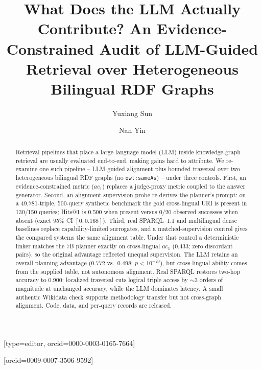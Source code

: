 \documentclass[a4paper,fleqn]{cas-dc}
\newcommand{\ac}[0]{\ensuremath{ac_1}}
\begin{document}
\let\WriteBookmarks\relax
\def\floatpagepagefraction{1}
\def\textpagefraction{.001}


\title[mode = title]{What Does the LLM Actually Contribute? An Evidence-Constrained
Audit of LLM-Guided Retrieval over Heterogeneous Bilingual RDF Graphs}

\author[1]{Yuxiang Sun}[type=editor,
  orcid=0000-0003-0165-7664]

\author[2]{Nan Yin}[orcid=0009-0007-3506-9592]


\begin{abstract}
Retrieval pipelines that place a large language model (LLM) inside
knowledge-graph retrieval are usually evaluated end-to-end, making gains hard
to attribute. We re-examine one such pipeline -- LLM-guided alignment plus
bounded traversal over two heterogeneous bilingual RDF graphs (no
\texttt{owl:sameAs}) -- under three controls. First, an evidence-constrained
metric (\ac{}) replaces a judge-proxy metric coupled to the answer generator.
Second, an alignment-supervision probe re-derives the planner's prompt: on a
49{,}781-triple, 500-query synthetic benchmark the gold cross-lingual URI is
present in 130/150 queries; Hits@1 is 0.500 when present versus 0/20 observed
successes when absent (exact 95\% CI $[0,0.168]$). Third, real SPARQL~1.1 and
multilingual dense baselines replace capability-limited surrogates, and a
matched-supervision control gives the compared systems the same alignment
table. Under that control a deterministic linker matches the 7B planner exactly
on cross-lingual \ac{} (0.433; zero discordant pairs), so the original
advantage reflected unequal supervision. The LLM retains an overall planning
advantage (0.772 vs.\ 0.498; $p<10^{-20}$), but cross-lingual ability comes
from the supplied table, not autonomous alignment. Real SPARQL restores
two-hop accuracy to 0.900; localized traversal cuts logical triple access by
$\sim$3 orders of magnitude at unchanged accuracy, while the LLM dominates
latency. A small authentic Wikidata check supports methodology transfer but
not cross-graph alignment. Code, data, and per-query records are released.
\end{abstract}
\end{document}
